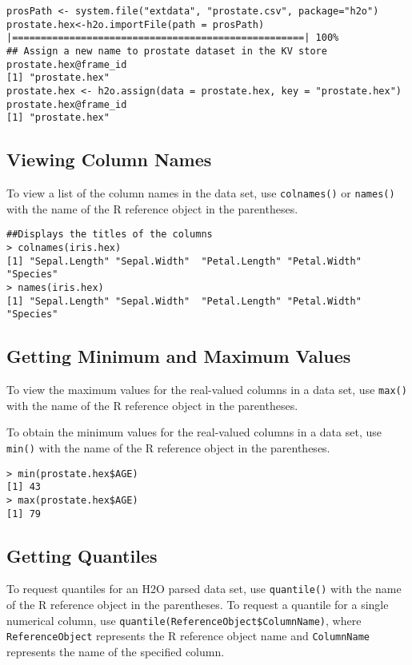 {\newpage
\begin{lstlisting}[style=R]
prosPath <- system.file("extdata", "prostate.csv", package="h2o")
prostate.hex<-h2o.importFile(path = prosPath)
|===================================================| 100%
## Assign a new name to prostate dataset in the KV store
prostate.hex@frame_id
[1] "prostate.hex"
prostate.hex <- h2o.assign(data = prostate.hex, key = "prostate.hex")
prostate.hex@frame_id
[1] "prostate.hex"

\end{lstlisting}

\subsection{Viewing Column Names}

To view a list of the column names in the data set, use {\texttt{colnames()}} or {\texttt{names()}} with the name of the R reference object in the parentheses.

\begin{lstlisting}[style=R]
##Displays the titles of the columns
> colnames(iris.hex)
[1] "Sepal.Length" "Sepal.Width"  "Petal.Length" "Petal.Width"  "Species"     
> names(iris.hex)
[1] "Sepal.Length" "Sepal.Width"  "Petal.Length" "Petal.Width"  "Species"     
\end{lstlisting}


\subsection{Getting Minimum and Maximum Values}

To view the maximum values for the real-valued columns in a data set, use {\texttt{max()}} with the name of the R reference object in the parentheses.

To obtain the minimum values for the real-valued columns in a data set, use {\texttt{min()}} with the name of the R reference object in the parentheses.
\smallskip
\begin{lstlisting}[style=R]
> min(prostate.hex$AGE)
[1] 43
> max(prostate.hex$AGE)
[1] 79
\end{lstlisting}



\subsection{Getting Quantiles}

To request quantiles for an H2O parsed data set, use {\texttt{quantile()}} with the name of the R reference object in the parentheses.
To request a quantile for a single numerical column, use {\texttt{quantile(ReferenceObject\$ColumnName)}},  where {\texttt{ReferenceObject}} represents the R reference object name and {\texttt{ColumnName}} represents the name of the specified column. 

}
